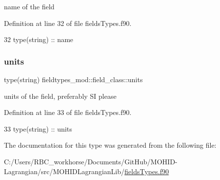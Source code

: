 name of the field 



Definition at line 32 of file fields\+Types.\+f90.


\begin{DoxyCode}
32         \textcolor{keywordtype}{type}(string) :: name
\end{DoxyCode}
\mbox{\label{structfieldtypes__mod_1_1field__class_abd4cf1204fbe4f2d174dd81230511077}} 
\subsubsection{\texorpdfstring{units}{units}}
{\footnotesize\ttfamily type(string) fieldtypes\+\_\+mod\+::field\+\_\+class\+::units\hspace{0.3cm}{\ttfamily [private]}}



units of the field, preferably SI please 



Definition at line 33 of file fields\+Types.\+f90.


\begin{DoxyCode}
33         \textcolor{keywordtype}{type}(string) :: units
\end{DoxyCode}


The documentation for this type was generated from the following file\+:\begin{DoxyCompactItemize}
\item 
C\+:/\+Users/\+R\+B\+C\+\_\+workhorse/\+Documents/\+Git\+Hub/\+M\+O\+H\+I\+D-\/\+Lagrangian/src/\+M\+O\+H\+I\+D\+Lagrangian\+Lib/\mbox{\hyperlink{fields_types_8f90}{fields\+Types.\+f90}}\end{DoxyCompactItemize}
